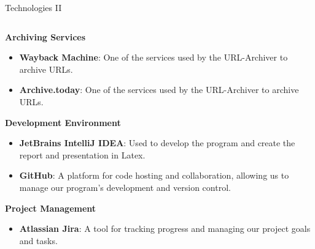 \documentclass[
    ngerman,%
    authorontitle=true,
]{bfhbeamer}
\begin{document}
    \begin{frame}{Technologies II}
        \begin{columns}
            \begin{column}{0.7\textwidth}
                \textbf{Archiving Services}
                \begin{itemize}
                    \item \textbf{Wayback Machine}: One of the services used by the URL-Archiver to archive URLs.
                    \item \textbf{Archive.today}: One of the services used by the URL-Archiver to archive URLs.
                \end{itemize}
                \textbf{Development Environment}
                \begin{itemize}
                    \item \textbf{JetBrains IntelliJ IDEA}: Used to develop the program and create the report and presentation in Latex.
                \end{itemize}
                \begin{itemize}
                    \item \textbf{GitHub}: A platform for code hosting and collaboration, allowing us to manage our program's development and version control.
                \end{itemize}
                \textbf{Project Management}
                \begin{itemize}
                    \item \textbf{Atlassian Jira}: A tool for tracking progress and managing our project goals and tasks.
                \end{itemize}


\end{column}
\end{columns}
\end{frame}
\end{document}
